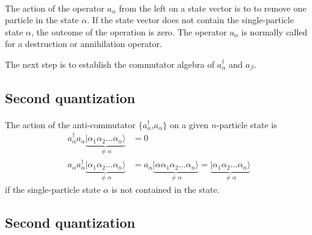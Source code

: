 \documentclass[%
twoside,                 %
final,                   %
10pt]{article}
\begin{document}
\paragraph{}
The action of the operator 
$a_\alpha$ from the left on a state vector  is to to remove  one particle in the state
$\alpha$. 
If the state vector does not contain the single-particle state $\alpha$, the outcome of the operation is zero.
The operator  $a_\alpha$ is normally called for a destruction or annihilation operator.

The next step is to establish the  commutator algebra of $a_\alpha^{\dagger}$ and
$a_\beta$.




\subsection*{Second quantization}

\paragraph{}
The action of the anti-commutator 
$\{a_\alpha^{\dagger}$,$a_\alpha\}$ on a given $n$-particle state is
\begin{align}
	a_\alpha^{\dagger} a_\alpha \underbrace{|\alpha_1\alpha_2 \dots \alpha_{n}\rangle}_{\neq \alpha} &= 0 \nonumber \\
	a_\alpha a_\alpha^{\dagger} \underbrace{|\alpha_1\alpha_2 \dots \alpha_{n}\rangle}_{\neq \alpha} &=
	a_\alpha \underbrace{|\alpha \alpha_1\alpha_2 \dots \alpha_{n}\rangle}_{\neq \alpha} = 
	\underbrace{|\alpha_1\alpha_2 \dots \alpha_{n}\rangle}_{\neq \alpha} \label{eq:2-16a}
\end{align}
if the single-particle state $\alpha$ is not contained in the state.




\subsection*{Second quantization}

\end{document}
